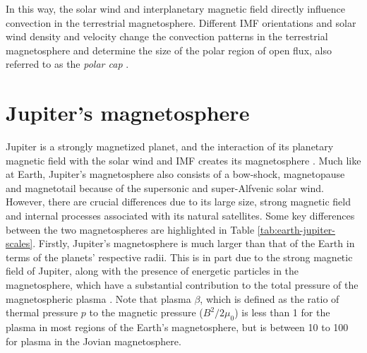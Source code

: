 In this way, the solar wind and interplanetary magnetic field directly influence convection in the terrestrial magnetosphere. Different IMF orientations and solar wind density and velocity change the convection patterns in the terrestrial magnetosphere and determine the size of the polar region of open flux,  also referred to as the \emph{polar cap} \cite{Heelis1984TheConvection,Milan2008ResponseOnset}. 

\section{Jupiter's magnetosphere}

Jupiter is a strongly magnetized planet, and the interaction of its planetary magnetic field with the solar wind and IMF creates its magnetosphere \cite{Krupp2004DynamicsMagnetosphere}. Much like at Earth, Jupiter's magnetosphere also consists of a bow-shock, magnetopause and magnetotail because of the supersonic and super-Alfvenic solar wind. However, there are crucial differences due to its large size, strong magnetic field and internal processes associated with its natural satellites. Some key differences between the two magnetospheres are highlighted in Table \ref{tab:earth-jupiter-scales}. Firstly, Jupiter's magnetosphere is much larger than that of the Earth in terms of the planets' respective radii. This is in part due to the strong magnetic field of Jupiter, along with the presence of energetic particles in the magnetosphere, which have a substantial contribution to the total pressure of the magnetospheric plasma \cite{Bagenal2011b}. Note that plasma $\beta$, which is defined as the ratio of thermal pressure $p$ to the magnetic pressure ($B^2/2\mu_0$) is less than 1 for the plasma in most regions of the Earth's magnetosphere, but is between 10 to 100 for plasma in the Jovian magnetosphere.

